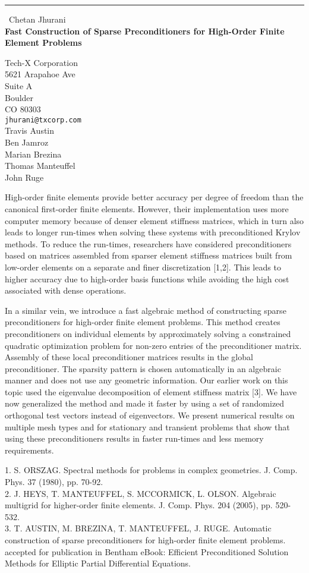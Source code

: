 \documentclass{report}
\begin{document}
\begin{center}
\rule{6in}{1pt} \
{\large Chetan Jhurani \\
{\bf Fast Construction of Sparse Preconditioners for High-Order Finite Element Problems}}

Tech-X Corporation \\ 5621 Arapahoe Ave \\ Suite A \\ Boulder \\ CO 80303
\\
{\tt jhurani@txcorp.com}\\
Travis Austin\\
Ben Jamroz\\
Marian Brezina\\
Thomas Manteuffel\\
John Ruge\end{center}

High-order finite elements provide better accuracy per degree of freedom
than the canonical first-order finite elements. However, their
implementation uses more computer memory because of denser element
stiffness matrices, which in turn also leads to longer run-times when
solving these systems with preconditioned Krylov methods. To reduce the
run-times, researchers have considered preconditioners based on matrices
assembled from sparser element stiffness matrices built from low-order
elements on a separate and finer discretization [1,2]. This leads to
higher accuracy due to high-order basis functions while avoiding the high
cost associated with dense operations.

In a similar vein, we introduce a fast algebraic method of constructing
sparse preconditioners for high-order finite element problems. This
method creates preconditioners on individual elements by approximately
solving a constrained quadratic optimization problem for non-zero entries
of the preconditioner matrix. Assembly of these local preconditioner
matrices results in the global preconditioner. The sparsity pattern is
chosen automatically in an algebraic manner and does not use any
geometric information. Our earlier work on this topic used the eigenvalue
decomposition of element stiffness matrix [3]. We have now generalized
the method and made it faster by using a set of randomized orthogonal
test vectors instead of eigenvectors. We present numerical results on
multiple mesh types and for stationary and transient problems that show
that using these preconditioners results in faster run-times and less
memory requirements.

1. S. ORSZAG. Spectral methods for problems in complex geometries. J.
Comp. Phys. 37 (1980), pp. 70-92.\\
2. J. HEYS, T. MANTEUFFEL, S. MCCORMICK, L. OLSON. Algebraic multigrid
for higher-order finite elements. J. Comp. Phys. 204 (2005), pp.
520-532.\\
3. T. AUSTIN, M. BREZINA, T. MANTEUFFEL, J. RUGE. Automatic construction
of sparse preconditioners for high-order finite element problems.
accepted for publication in Bentham eBook: Efficient Preconditioned
Solution Methods for Elliptic Partial Differential Equations.
\end{document}
